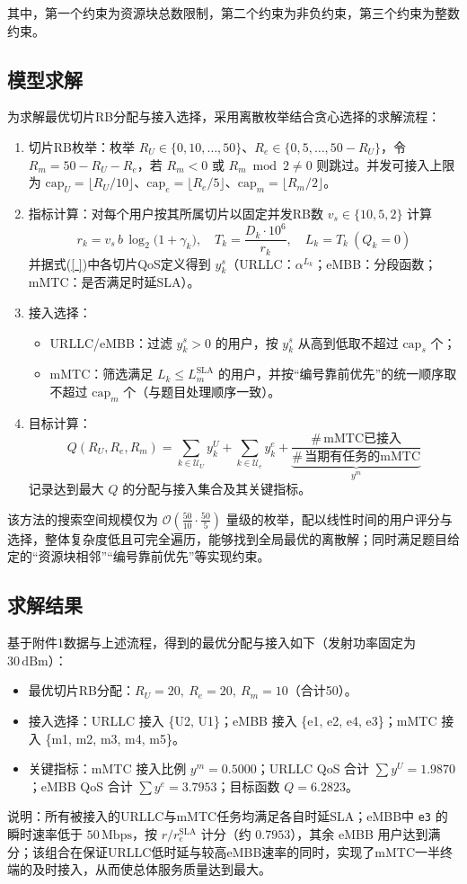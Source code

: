 其中，第一个约束为资源块总数限制，第二个约束为非负约束，第三个约束为整数约束。
\subsection{模型求解}
为求解最优切片RB分配与接入选择，采用离散枚举结合贪心选择的求解流程：

\begin{enumerate}
  \item 切片RB枚举：枚举 $R_U\in\{0,10,\dots,50\}$、$R_e\in\{0,5,\dots,50-R_U\}$，令 $R_m=50-R_U-R_e$，若 $R_m<0$ 或 $R_m\bmod 2\ne 0$ 则跳过。并发可接入上限为 $\mathrm{cap}_U=\lfloor R_U/10\rfloor$、$\mathrm{cap}_e=\lfloor R_e/5\rfloor$、$\mathrm{cap}_m=\lfloor R_m/2\rfloor$。
  \item 指标计算：对每个用户按其所属切片以固定并发RB数 $v_s\in\{10,5,2\}$ 计算
  \[
    r_k = v_s\,b\,\log_2\bigl(1+\gamma_k\bigr),\quad T_k=\frac{D_k\cdot10^6}{r_k},\quad L_k=T_k \ (Q_k=0)
  \]
  并据式(\ref{ })中各切片QoS定义得到 $y_k^s$（URLLC：$\alpha^{L_k}$；eMBB：分段函数；mMTC：是否满足时延SLA）。
  \item 接入选择：
  \begin{itemize}
    \item URLLC/eMBB：过滤 $y_k^s\!>\!0$ 的用户，按 $y_k^s$ 从高到低取不超过 $\mathrm{cap}_s$ 个；
    \item mMTC：筛选满足 $L_k\le L_m^{\mathrm{SLA}}$ 的用户，并按“编号靠前优先”的统一顺序取不超过 $\mathrm{cap}_m$ 个（与题目处理顺序一致）。
  \end{itemize}
  \item 目标计算：
  \[
    Q(R_U,R_e,R_m)=\sum_{k\in\mathcal U_U} y_k^U + \sum_{k\in\mathcal U_e} y_k^e + \underbrace{\frac{\#\,\text{mMTC已接入}}{\#\,\text{当期有任务的mMTC}}}_{y^{m}}
  \]
  记录达到最大 $Q$ 的分配与接入集合及其关键指标。
\end{enumerate}

该方法的搜索空间规模仅为 $\mathcal O(\frac{50}{10}\cdot\frac{50}{5})$ 量级的枚举，配以线性时间的用户评分与选择，整体复杂度低且可完全遍历，能够找到全局最优的离散解；同时满足题目给定的“资源块相邻”“编号靠前优先”等实现约束。

\subsection{求解结果}

基于附件1数据与上述流程，得到的最优分配与接入如下（发射功率固定为 $30\,\mathrm{dBm}$）：

\begin{itemize}
  \item 最优切片RB分配：$R_U=20,\ R_e=20,\ R_m=10$（合计50）。
  \item 接入选择：URLLC 接入 \{U2, U1\}；eMBB 接入 \{e1, e2, e4, e3\}；mMTC 接入 \{m1, m2, m3, m4, m5\}。
  \item 关键指标：mMTC 接入比例 $y^{m}=0.5000$；URLLC QoS 合计 $\sum y^{U}=1.9870$；eMBB QoS 合计 $\sum y^{e}=3.7953$；目标函数 $Q=6.2823$。
\end{itemize}

说明：所有被接入的URLLC与mMTC任务均满足各自时延SLA；eMBB中 \texttt{e3} 的瞬时速率低于 $50\,\mathrm{Mbps}$，按 $r/r_e^{\mathrm{SLA}}$ 计分（约 $0.7953$），其余 eMBB 用户达到满分；该组合在保证URLLC低时延与较高eMBB速率的同时，实现了mMTC一半终端的及时接入，从而使总体服务质量达到最大。